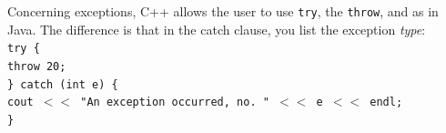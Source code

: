 Concerning exceptions, C++ allows the user to use \texttt{try}, the \texttt{throw}, and  as in Java. The difference is that in the catch clause, you list the exception \textit{type}: \\

\indent \texttt{try \{} \\
\indent \indent \texttt{throw 20;} \\
\indent \texttt{\} catch (int e) \{} \\
\indent \indent \texttt{cout $<<$ "An exception occurred, no. " $<<$ e $<<$ endl;} \\
\indent \texttt{\}} \\

